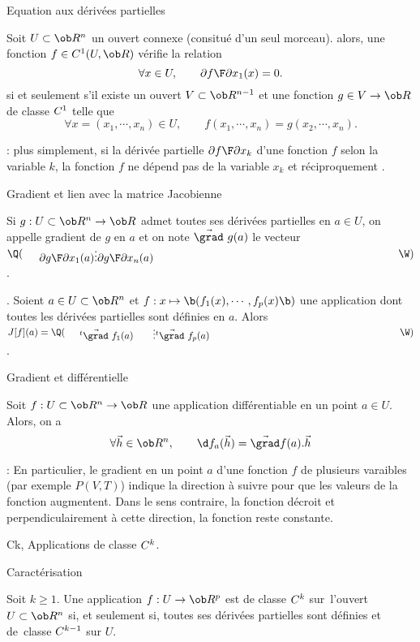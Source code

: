 \Concept [] Equation aux d\'eriv\'ees partielles

\Propriete []  Soit $U\subset\ob R^n$ un ouvert connexe (consitu\'e d'un seul morceau). alors, une fonction $f\in\sc C^1(U,\ob R)$ v\'erifie la relation 
$$ 
\forall x\in U,\qquad {\partial f\F\partial x_1}(x)=0. 
$$
si et seulement s'il existe un ouvert $V\subset\ob R^{n-1}$ et une fonction $g\in V \to\ob R$ de classe $\sc C^1$ telle que 
$$
\forall x=(x_1,\cdots,x_n)\in U, \qquad f(x_1,\cdots,x_n)=g(x_2,\cdots,x_n).
$$

\Remarque : plus simplement, si la d\'eriv\'ee partielle ${\partial f\F\partial x_k}$ d'une fonction $f$ selon la variable $k$, la fonction $f$ ne d\'epend pas de la variable $x_k$ et r\'eciproquement . 
\bigskip


\Concept [] Gradient et lien avec la matrice Jacobienne

\Definition []  Si $g:U\subset\ob R^n\to\ob R$ admet toutes ses d\'eriv\'ees partielles en $a\in U$, 
on appelle gradient de $g$ en $a$ et on note $\vec{\grad}\ g(a)$ 
le vecteur $\Q(\vcenter{\mbox{${\partial g\F\partial x_1}(a)$}\mbox{$\vdots$}\mbox{${\partial g\F\partial x_n}(a)$}}\W)$. 
\bigskip

\Remarque. Soient $a\in U\subset\ob R^n$ et $f:x\mapsto\b(f_1(x),\cdots, f_p(x)\b)$ une application 
dont toutes les d\'eriv\'ees partielles sont d\'efinies en $a$. 
Alors $J[f](a)=\Q(\vcenter{\mbox{$\null^t\vec{\grad}\ f_1(a)$}\mbox{\qquad$\vdots$}\mbox{$\null^t\vec{\grad}\ f_p(a)$}}\W)$. 
\medskip

\Concept [] Gradient et diff\'erentielle

\Propriete []  Soit $f:U\subset \ob R^n\to\ob R$ une application diff\'erentiable en un point $a\in U$. Alors, on a 
$$
\forall \vec h\in\ob R^n, \qquad \d f_a(\vec h)=\vec{\grad}f(a).\vec h
$$

\Remarque : En particulier, le gradient en un point $a$ d'une fonction $f$ de plusieurs varaibles (par exemple $P(V,T)$) indique la direction \`a suivre pour que les valeurs de la fonction augmentent. Dans le sens contraire, la fonction d\'ecroit et perpendiculairement \`a cette direction, la fonction reste constante. 
\bigskip

\Subsection Ck, Applications de classe $\sc C^k$.

\Concept [] Caract\'erisation

\Definition []  Soit $k\ge1$. Une application $f:U\to\ob R^p$ est de classe $\sc C^k$ 
sur~l'ouvert $U\subset\ob R^n$ si, et seulement si, toutes ses d\'eriv\'ees partielles 
sont d\'efinies et de~classe $\sc C^{k-1}$ sur $U$. 
\bigskip



